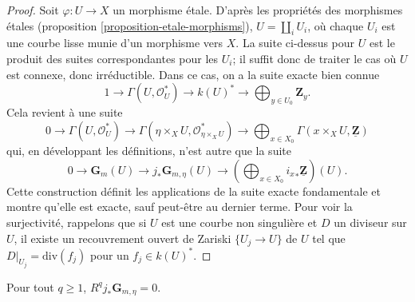 \begin{proof}
Soit $\varphi : U \to X$ un morphisme étale. D'après les propriétés des
morphismes étales (proposition \ref{proposition-etale-morphisms}),
$U = \coprod_i U_i$, où chaque $U_i$ est une courbe lisse munie d'un morphisme vers $X$.
La suite ci-dessus pour $U$ est le produit des suites correspondantes
pour les $U_i$; il suffit donc de traiter le cas où $U$ est connexe,
donc irréductible. Dans ce cas, on a la suite exacte bien connue
$$
1 \longrightarrow
\Gamma(U, \mathcal{O}_U^*) \longrightarrow
k(U)^* \longrightarrow \bigoplus\nolimits_{y \in U_0} \mathbf{Z}_y.
$$
Cela revient à une suite
$$
0 \longrightarrow \Gamma(U, \mathcal{O}_U^*) \longrightarrow
\Gamma(\eta \times_X U, \mathcal{O}_{\eta \times_X U}^*) \longrightarrow
\bigoplus\nolimits_{x \in X_0}
\Gamma(x \times_X U, \underline{\mathbf{Z}})
$$
qui, en développant les définitions, n'est autre que la suite
$$
0 \longrightarrow \mathbf{G}_m(U) \longrightarrow
j_* \mathbf{G}_{m, \eta}(U) \longrightarrow
\left(\bigoplus\nolimits_{x \in X_0} {i_x}_* \underline{\mathbf{Z}}\right)(U).
$$
Cette construction définit les applications de la suite exacte fondamentale et montre
qu'elle est exacte, sauf peut-être au dernier terme. Pour voir la surjectivité, rappelons que si
$U$ est une courbe non singulière et $D$ un diviseur sur $U$,
il existe un recouvrement ouvert de Zariski $\{U_j \to U\}$ de $U$
tel que $D|_{U_j} = \text{div}(f_j)$ pour un $f_j \in k(U)^*$.
\end{proof}

\begin{lemma}
\label{lemma-higher-direct-jstar-Gm}
Pour tout $q \geq 1$, $R^q j_*\mathbf{G}_{m, \eta} = 0$.
\end{lemma}

